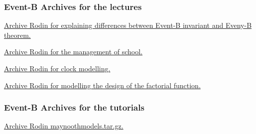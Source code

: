 \documentclass[ 12pt]{article}
\begin{document}
\subsubsection{Event-B Archives for the  lectures}

 \href{http://mery54.github.io/teaching/mosos/lecturesnotes/
   ex-safety.zip}{Archive Rodin  for  explaining differences between
   Event-B invariant and Eveny-B theorem. }


 
 \href{http://mery54.github.io/teaching/mosos/models/
   ex-school.zip}{Archive Rodin  for   the management of school. }

 
 
 \href{http://mery54.github.io/teaching/mosos/models/clock-tut0.zip}{Archive Rodin  for  clock modelling. }

  \href{http://mery54.github.io/teaching/mosos/lecturesnotes/factorial-plugin-tutO.zip}{Archive Rodin  for   modelling  the 
   design of the factorial function.}
  


 \subsubsection{Event-B Archives for   the tutorials}
\label{sec:event-b-archives}



\href{http://mery54.github.io/teaching/mosos/models/maynoothmodels.tar.gz}{Archive
  Rodin  maynoothmodels.tar.gz.}







\end{document}
